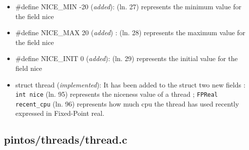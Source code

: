\documentclass[11pt]{scrartcl}
\begin{document}
\begin{itemize}
	\item \#define NICE\_MIN -20 (\textit{added}): \newline
		(ln. 27) represents the minimum value for the field nice
	\item \#define NICE\_MAX 20 (\textit{added}) :\newline
		(ln. 28) represents the maximum value for the field nice
	\item \#define NICE\_INIT 0 (\textit{added}):\newline
		(ln. 29) represents the initial value for the field nice
    \item struct thread (\textit{implemented}):\newline
    It has been added to the struct two new fields : \texttt{int nice} (ln. 95) represents the niceness value of a thread ; \texttt{FPReal recent\_cpu} (ln. 96) represents how much cpu the thread has used recently expressed in Fixed-Point real.    

    
\end{itemize}

\subsection*{pintos/threads/thread.c}
\end{document}
